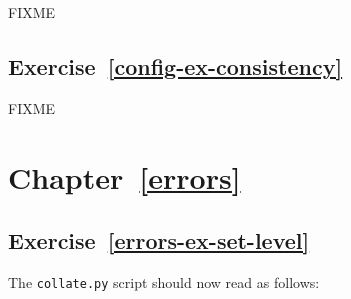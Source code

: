 \documentclass[
]{krantz}
\begin{document}
FIXME

\hypertarget{exercise-refconfig-ex-consistency}{%
\subsection*{Exercise~\ref{config-ex-consistency}}\label{exercise-refconfig-ex-consistency}}


FIXME

\hypertarget{chapter-referrors}{%
\section*{Chapter~\ref{errors}}\label{chapter-referrors}}

\hypertarget{exercise-referrors-ex-set-level}{%
\subsection*{Exercise~\ref{errors-ex-set-level}}\label{exercise-referrors-ex-set-level}}


The \texttt{collate.py} script should now read as follows:
\end{document}
